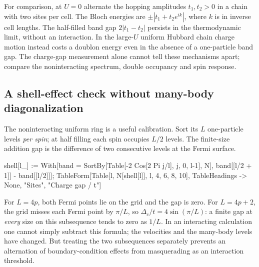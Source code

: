 For comparison, at $U=0$ alternate the hopping amplitudes
$t_1,t_2>0$ in a chain with two sites per cell. The Bloch energies are
$\pm|t_1+t_2 e^{ik}|$, where $k$ is in inverse cell lengths. The
half-filled band gap $2|t_1-t_2|$ persists in the thermodynamic limit,
without an interaction. In the large-$U$ uniform Hubbard chain charge
motion instead costs a doublon energy even in the absence of a
one-particle band gap. The charge-gap measurement alone cannot tell
these mechanisms apart; compare the noninteracting spectrum, double
occupancy and spin response.

\subsection{A shell-effect check without many-body diagonalization}
The noninteracting uniform ring is a useful calibration. Sort its
$L$ one-particle levels \emph{per spin}; at half filling each spin
occupies $L/2$ levels. The finite-size addition gap is the difference
of two consecutive levels at the Fermi surface.
\begin{wl}
shell[l_] := With[{band = SortBy[Table[-2 Cos[2 Pi j/l], {j, 0, l-1}], N]},
  band[[l/2 + 1]] - band[[l/2]]];
TableForm[Table[{l, N[shell[l]]}, {l, {4, 6, 8, 10}}],
  TableHeadings -> {None, {"Sites", "Charge gap / t"}}]
\end{wl}
For $L=4p$, both Fermi points lie on the grid and the gap is zero.
For $L=4p+2$, the grid misses each Fermi point by $\pi/L$, so
$\Delta_c/t=4\sin(\pi/L)$: a finite gap at \emph{every} size on this
subsequence tends to zero as $1/L$. In an interacting calculation one
cannot simply subtract this formula; the velocities and the many-body
levels have changed. But treating the two subsequences separately
prevents an alternation of boundary-condition effects from masquerading
as an interaction threshold.


